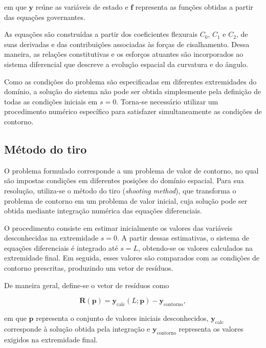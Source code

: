\documentclass[arial,centeredequations,english,brazilian,oneside,section=TITLE]{ifes8}
\begin{document}
em que $\mathbf{y}$ reúne as variáveis de estado e
$\mathbf{f}$ representa as funções obtidas a partir das equações
governantes.

As equações são construídas a partir dos coeficientes flexurais
$C_0$, $C_1$ e $C_2$, de suas derivadas e das contribuições
associadas às forças de cisalhamento. Dessa maneira, as relações
constitutivas e os esforços atuantes são incorporados ao sistema
diferencial que descreve a evolução espacial da curvatura e do
ângulo.

Como as condições do problema são especificadas em diferentes
extremidades do domínio, a solução do sistema não pode ser obtida
simplesmente pela definição de todas as condições iniciais em
$s=0$. Torna-se necessário utilizar um procedimento numérico
específico para satisfazer simultaneamente as condições de contorno.

\subsection{Método do tiro}
\label{subsec:metodo-tiro}

O problema formulado corresponde a um problema de valor de contorno,
no qual são impostas condições em diferentes posições do domínio
espacial. Para sua resolução, utiliza-se o método do tiro
(\textit{shooting method}), que transforma o problema de contorno
em um problema de valor inicial, cuja solução pode ser obtida
mediante integração numérica das equações diferenciais.

O procedimento consiste em estimar inicialmente os valores das
variáveis desconhecidas na extremidade $s=0$. A partir dessas
estimativas, o sistema de equações diferenciais é integrado até
$s=L$, obtendo-se os valores calculados na extremidade final.
Em seguida, esses valores são comparados com as condições de
contorno prescritas, produzindo um vetor de resíduos.

De maneira geral, define-se o vetor de resíduos como

\begin{equation}
  \mathbf{R}(\mathbf{p}) =
  \mathbf{y}_{\mathrm{calc}}(L;\mathbf{p}) -
  \mathbf{y}_{\mathrm{contorno}},
  \label{eq:residuo-tiro}
\end{equation}

em que $\mathbf{p}$ representa o conjunto de valores iniciais
desconhecidos, $\mathbf{y}_{\mathrm{calc}}$ corresponde à solução
obtida pela integração e $\mathbf{y}_{\mathrm{contorno}}$
representa os valores exigidos na extremidade final.
\end{document}
